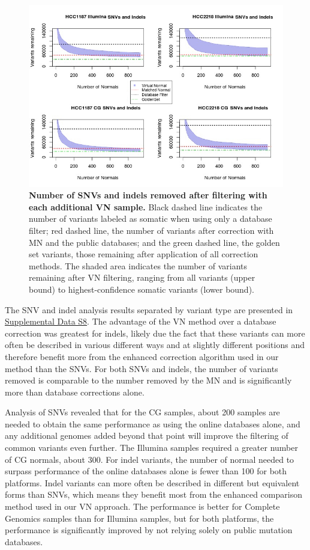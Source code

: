 \begin{figure}[t!]
\centering
\includegraphics[width=\textwidth]{chapters/images/virtualnormal/Hiltemann_Figure4_fixed.jpg}
\caption{\textbf{Number of SNVs and indels removed after filtering with each additional VN sample.} Black dashed line indicates the number of variants labeled as somatic when using only a database filter; red dashed line, the number of variants after correction with MN and the public databases; and the green dashed line, the golden set variants, those remaining after application of all correction methods. The shaded area indicates the number of variants remaining after VN filtering, ranging from all variants (upper bound) to highest-confidence somatic variants (lower bound).}
\label{fig:vnsize2}
\end{figure}

The SNV and indel analysis results separated by variant type are presented in \href{https://genome.cshlp.org/content/25/9/1382/suppl/DC1}{Supplemental Data S8}. The advantage of the VN method over a database correction was greatest for indels, likely due the fact that these variants can more often be described in various different ways and at slightly different positions and therefore benefit more from the enhanced correction algorithm used in our method than the SNVs. For both SNVs and indels, the number of variants removed is comparable to the number removed by the MN and is significantly more than database corrections alone.

Analysis of SNVs revealed that for the CG samples, about 200 samples are needed to obtain the same performance as using the online databases alone, and any additional genomes added beyond that point will improve the filtering of common variants even further. The Illumina samples required a greater number of CG normals, about 300. For indel variants, the number of normal needed to surpass performance of the online databases alone is fewer than 100 for both platforms. Indel variants can more often be described in different but equivalent forms than SNVs, which means they benefit most from the enhanced comparison method used in our VN approach. The performance is better for Complete Genomics samples than for Illumina samples, but for both platforms, the performance is significantly improved by not relying solely on public mutation databases.

